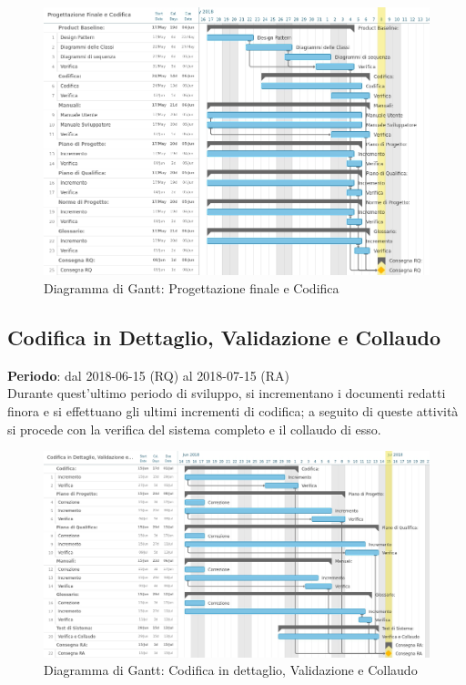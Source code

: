 \begin{figure}[h!]
	\centerline{\includegraphics[scale=0.5]{img/DiagrammiGantt/ProgettazioneFinaleCodifica.jpg}}
	\caption{Diagramma di Gantt: Progettazione finale e Codifica}
	\label{fig:gantt_prog_fin_cod}
\end{figure}
\clearpage

\subsection{Codifica in Dettaglio, Validazione e Collaudo}
\textbf{Periodo}: dal 2018-06-15 (RQ) al 2018-07-15 (RA)\\

Durante quest'ultimo periodo di sviluppo, si incrementano i documenti redatti finora e si effettuano gli ultimi incrementi di codifica; a seguito di queste attività si procede con la verifica del sistema completo e il collaudo di esso.

\begin{figure}[h!]
	\centerline{\includegraphics[scale=0.45]{img/DiagrammiGantt/CodificaValidazioneCollaudo.jpg}}
	\caption{Diagramma di Gantt: Codifica in dettaglio, Validazione e Collaudo}
	\label{fig:gantt_cod_valid_coll}
\end{figure}
\clearpage

